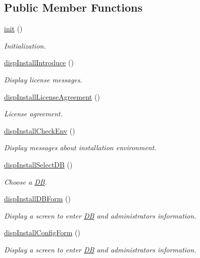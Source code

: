 \subsection*{Public Member Functions}
\begin{DoxyCompactItemize}
\item 
\hyperlink{classinstallView_ab24b18fa10e0268846ac0002d77ee453}{init} ()
\begin{DoxyCompactList}\small\item\em Initialization. \end{DoxyCompactList}\item 
\hyperlink{classinstallView_a811e5c499d36055efb16411c0f0946c1}{disp\+Install\+Introduce} ()
\begin{DoxyCompactList}\small\item\em Display license messages. \end{DoxyCompactList}\item 
\hyperlink{classinstallView_a7182430aaf7f9fb4c8e18d21e9e5a4e7}{disp\+Install\+License\+Agreement} ()
\begin{DoxyCompactList}\small\item\em License agreement. \end{DoxyCompactList}\item 
\hyperlink{classinstallView_ac73107933a9a9498aaef04380137794d}{disp\+Install\+Check\+Env} ()
\begin{DoxyCompactList}\small\item\em Display messages about installation environment. \end{DoxyCompactList}\item 
\hyperlink{classinstallView_aa3ee9747353f128111f628a5c9359c5f}{disp\+Install\+Select\+DB} ()
\begin{DoxyCompactList}\small\item\em Choose a \hyperlink{classDB}{DB}. \end{DoxyCompactList}\item 
\hyperlink{classinstallView_a61a05991e6aa8bf2278b9c438b70c8c7}{disp\+Install\+D\+B\+Form} ()
\begin{DoxyCompactList}\small\item\em Display a screen to enter \hyperlink{classDB}{DB} and administrator\textquotesingle{}s information. \end{DoxyCompactList}\item 
\hyperlink{classinstallView_ad61c851960b71aad3b93cfd1a23149fb}{disp\+Install\+Config\+Form} ()
\begin{DoxyCompactList}\small\item\em Display a screen to enter \hyperlink{classDB}{DB} and administrator\textquotesingle{}s information. \end{DoxyCompactList}\item 

\end{DoxyCompactItemize}
